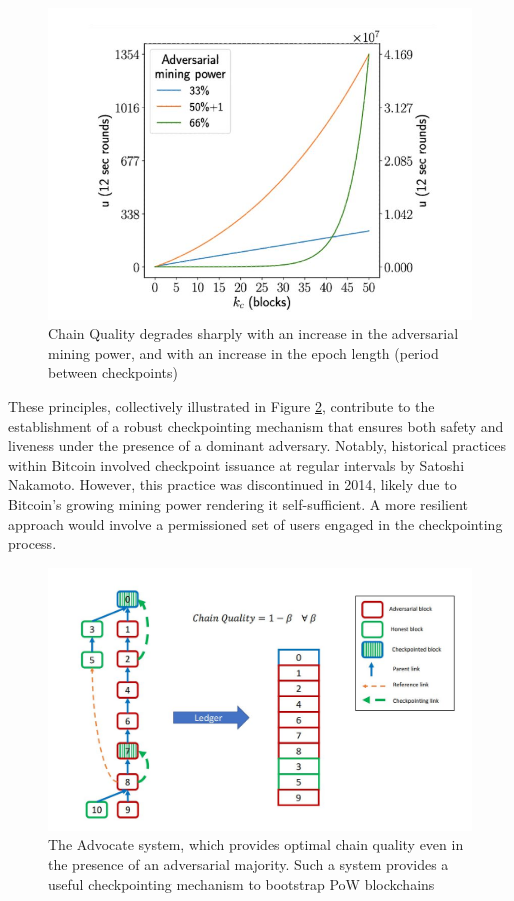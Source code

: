 \begin{figure}[h!]
	\centering
	\includegraphics[width=0.8\linewidth]{Fig/18/F5}
	\caption{Chain Quality degrades sharply with an increase in the adversarial mining power, and	with an increase in the epoch length (period between checkpoints)}
	\label{fig:L18_f5}
\end{figure}
These principles, collectively illustrated in Figure \ref{fig:L18_f6}, contribute to the establishment of a robust checkpointing mechanism that ensures both safety and liveness under the presence of a dominant adversary. Notably, historical practices within Bitcoin involved checkpoint issuance at regular intervals by Satoshi Nakamoto. However, this practice was discontinued in 2014, likely due to Bitcoin's growing mining power rendering it self-sufficient. A more resilient approach would involve a permissioned set of users engaged in the checkpointing process.\\
\begin{center}
	\begin{figure}
		\centering
		\includegraphics[width=0.8\linewidth]{Fig/18/F6}
		\caption{The Advocate system, which provides optimal chain quality even in the presence of an adversarial majority. Such a system provides a useful checkpointing mechanism to bootstrap PoW blockchains}
		\label{fig:L18_f6}
	\end{figure}
\end{center}
